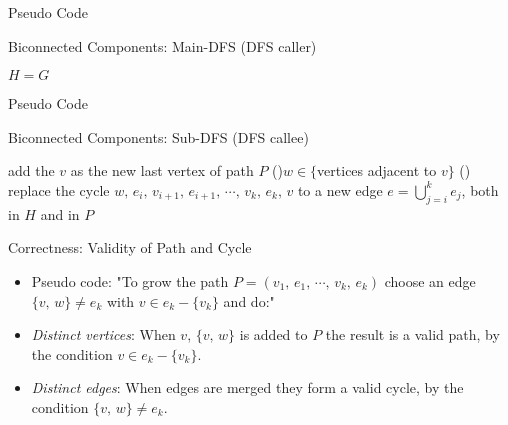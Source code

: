 \documentclass{beamer}
\begin{document}

\begin{frame}{Pseudo Code}
	\SetAlFnt{\small}
	\begin{algorithm}[H]
		\caption{Biconnected Components: Main-DFS (DFS caller)}
		$H=G$\;
	\end{algorithm}
\end{frame}

\begin{frame}{Pseudo Code}
	\SetAlFnt{\small}
	\begin{algorithm}[H]
		\caption{Biconnected Components: Sub-DFS (DFS callee)}
		add the $v$ as the new last vertex of path $P$\;
		\For(){$w\in \{$vertices adjacent to $v\}$}{
			\Else(){
				replace the cycle $w,\,e_i,\,v_{i+1},\,e_{i+1},\,\cdots,\,v_k,\,e_k,\,v$
				to a new edge $e=\bigcup_{j=i}^ke_j$, both in $H$ and in $P$\;
			}
		}
	\end{algorithm}
\end{frame}

\begin{frame}{Correctness: Validity of Path and Cycle}
	\begin{itemize}
		\item
		\alert{Pseudo code}: "To grow the path $P=(v_1,\,e_1,\,\cdots,\,v_k,\,e_k)$ choose an edge $\{v,\,w\}\neq e_k$
		with $v\in e_k-\{v_k\}$ and do:"
		\item
		\emph{Distinct vertices}: When $v,\,\{v,\,w\}$ is added to $P$ the result is a valid path, by the
		condition $v\in e_k-\{v_k\}$.
		\item
		\emph{Distinct edges}: When edges are merged they form a valid cycle, by the condition $\{v,\,w\}\neq e_k$.
	\end{itemize}
\end{frame}
\end{document}
